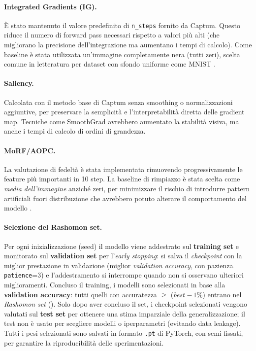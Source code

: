\documentclass[12pt,a4paper,oneside]{report}
\numberwithin{figure}{chapter}
\numberwithin{table}{chapter}
\begin{document}
\paragraph{Integrated Gradients (IG).}
È stato mantenuto il valore predefinito di \texttt{n\_steps} fornito da Captum.
Questo riduce il numero di forward pass necessari rispetto a valori più alti (che migliorano la precisione dell’integrazione ma aumentano i tempi di calcolo).
Come baseline è stata utilizzata un’immagine completamente nera (tutti zeri), scelta comune in letteratura per dataset con sfondo uniforme come MNIST \citep{sundararajan2017axiomatic}.

\paragraph{Saliency.}
Calcolata con il metodo base di Captum senza smoothing o normalizzazioni
aggiuntive, per preservare la semplicità e l’interpretabilità diretta delle
gradient map. Tecniche come SmoothGrad \citep{smilkov2017smoothgrad} avrebbero
aumentato la stabilità visiva, ma anche i tempi di calcolo di ordini di
grandezza.

\paragraph{MoRF/AOPC.}
La valutazione di fedeltà è stata implementata rimuovendo progressivamente le
feature più importanti in 10 step. La baseline di rimpiazzo è stata scelta come
\textit{media dell’immagine} anziché zeri, per minimizzare il rischio di
introdurre pattern artificiali fuori distribuzione che avrebbero potuto
alterare il comportamento del modello \citep{samek2016evaluating}.

\paragraph{Selezione del Rashomon set.}
Per ogni inizializzazione (seed) il modello viene addestrato sul
\textbf{training set} e monitorato sul \textbf{validation set} per
l'\emph{early stopping}: si salva il \emph{checkpoint} con la miglior
prestazione in validazione (miglior \emph{validation accuracy}, con pazienza
\texttt{patience}=3) e l'addestramento si interrompe quando non si osservano
ulteriori miglioramenti. Concluso il training, i modelli sono selezionati in
base alla \textbf{validation accuracy}: tutti quelli con accuratezza $\geq$
(\emph{best} $-\,1\%$) entrano nel \emph{Rashomon set}
(\citealp{mueller2023rashomon}). Solo dopo aver concluso il set, i checkpoint
selezionati vengono valutati sul \textbf{test set} per ottenere una stima
imparziale della generalizzazione; il test non è usato per scegliere modelli o
iperparametri (evitando data leakage). Tutti i pesi selezionati sono salvati in
formato \texttt{.pt} di PyTorch, con semi fissati, per garantire la
riproducibilità delle sperimentazioni.
\end{document}
